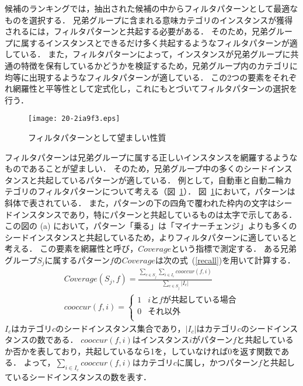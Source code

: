 \documentclass[japanese]{jnlp_1.4}
\begin{document}
候補のランキングでは，抽出された候補の中からフィルタパターンとして最適なものを選択する．
兄弟グループに含まれる意味カテゴリのインスタンスが獲得されるには，フィルタパターンと共起する必要がある．
そのため，兄弟グループに属するインスタンスとできるだけ多く共起するようなフィルタパターンが適している．
また，フィルタパターンによって，インスタンスが兄弟グループに共通の特徴を保有しているかどうかを検証するため，兄弟グループ内のカテゴリに均等に出現するようなフィルタパターンが適している．
この2つの要素をそれぞれ網羅性と平等性として定式化し，これにもとづいてフィルタパターンの選択を行う．

\begin{figure}[b]
\begin{center}
\texttt{[image: 20-2ia9f3.eps]}
\end{center}
 \caption{フィルタパターンとして望ましい性質}
 \label{fig:properties_filter_pattern}
\end{figure}

フィルタパターンは兄弟グループに属する正しいインスタンスを網羅するようなものであることが望ましい．
そのため，兄弟グループ中の多くのシードインスタンスと共起しているパターンが適している．
例として，自動車と自動二輪カテゴリのフィルタパターンについて考える（図~\ref{fig:properties_filter_pattern}）．
図~\ref{fig:properties_filter_pattern}において，パターンは斜体で表されている．
また，パターンの下の四角で覆われた枠内の文字はシードインスタンスであり，特にパターンと共起しているものは太字で示してある．
この図の (a) において，パターン「乗る」は「マイナーチェンジ」よりも多くのシードインスタンスと共起しているため，よりフィルタパターンに適していると考える．
この要素を網羅性と呼び，$\mathit{Coverage}$という指標で測定する．
ある兄弟グループ$S_{j}$に属するパターン$f$の$\mathit{Coverage}$は次の式~(\ref{recall})を用いて計算する．
\begin{gather}
\mathit{Coverage}(S_{j}, f) = \frac{\sum_{c \in S_{j}} \sum_{i \in I_{c}}\mathit{cooccur}(f, i)}{\sum_{c \in S_{j}}|I_{c}|}
	\label{recall} \\
\mathit{cooccur}(f, i) = \left \{ \begin{array}{ll}
1 & \text{$i$と$f$が共起している場合} \\
0 & \text{それ以外} \\
\end{array} \right.
\end{gather}
$I_{c}$はカテゴリ$c$のシードインスタンス集合であり，$|I_{c}|$はカテゴリ$c$のシードインスタンスの数である．
$\mathit{cooccur}(f, i)$はインスタンス$i$がパターン$f$と共起しているか否かを表しており，共起しているなら1を，していなければ0を返す関数である．
よって，$\sum_{i \in I_{c}} \mathit{cooccur}(f, i)$はカテゴリ$c$に属し，かつパターン$f$と共起しているシードインスタンスの数を表す．
\end{document}
